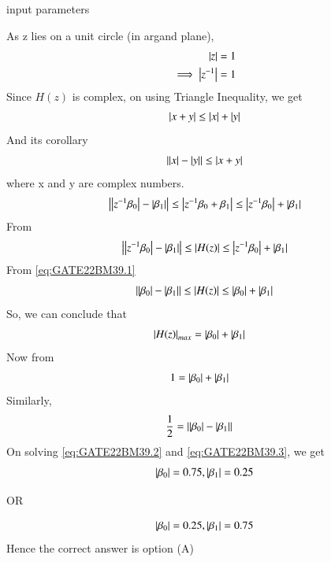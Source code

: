 \documentclass[journal,12pt,onecolumn]{IEEEtran}
\theoremstyle{remark}
\begin{document}
\begin{table}[!ht]
    \centering
        
    \caption{input parameters}
    \label{tab:GATE22BM39.1}
\end{table}
As z lies on a unit circle (in argand plane),
\begin{align}
\abs{z} &= 1 \\\implies
\abs{z^{-1}} &= 1 \label {eq:GATE22BM39.1}
\end{align}
Since $H(z)$ is complex, on using Triangle Inequality, we get
\begin{align}
\left\vert x + y\right\vert \leq \left\vert x\right\vert + \left\vert y\right\vert 
\end{align}
And its corollary
\begin{align}
\left\vert\left\vert x\right\vert-\left\vert y\right\vert\right\vert \leq \left\vert x + y\right\vert
\end{align}
where x and y are complex numbers.
\begin{align}
\left\vert\left\vert z^{-1}\beta_0\right\vert-\left\vert\beta_1\right\vert\right\vert \leq \left\vert z^{-1}\beta_0 + \beta_1\right\vert \leq \left\vert z^{-1}\beta_0\right\vert + \left\vert\beta_1\right\vert 
\end{align}
From 
\begin{align}
\left\vert\left\vert z^{-1}\beta_0\right\vert-\left\vert\beta_1\right\vert\right\vert \leq \left\vert H(z)\right\vert \leq \left\vert z^{-1}\beta_0\right\vert + \left\vert\beta_1\right\vert
\end{align}
From \eqref{eq:GATE22BM39.1} 
\begin{align}
\left\vert\left\vert\beta_0\right\vert-\left\vert\beta_1\right\vert\right\vert \leq \left\vert H(z)\right\vert \leq \left\vert\beta_0\right\vert + \left\vert\beta_1\right\vert 
\end{align}
So, we can conclude that
\begin{align}
\left\vert H(z)\right\vert_{max} &= \left\vert\beta_0\right\vert + \left\vert\beta_1\right\vert 
\end{align}
Now from 
\begin{align}
1 &= \abs{\beta_0} + \abs{\beta_1} \label {eq:GATE22BM39.2}
\end{align}
Similarly,
\begin{align}
\frac{1}{2} &= \abs{\abs{\beta_0}-\abs{\beta_1}} \label {eq:GATE22BM39.3}
\end{align}
On solving \eqref{eq:GATE22BM39.2} and \eqref{eq:GATE22BM39.3}, we get
\begin{align}
\left\vert\beta_0\right\vert = 0.75, \left\vert\beta_1\right\vert = 0.25 
\end{align}
\begin{center}
OR
\end{center}
\begin{align}
\left\vert\beta_0\right\vert = 0.25, \left\vert\beta_1\right\vert = 0.75 
\end{align}
Hence the correct answer is option (A) \\
\end{document}
